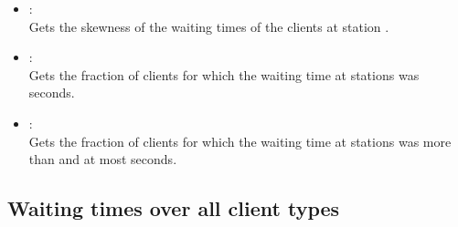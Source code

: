 \begin{itemize}
\item
{}:\\
Gets the skewness of the waiting times of the clients at station . 

\item
{}:\\
Gets the fraction of clients for which the waiting time at stations  was  seconds.

\item
{}:\\
Gets the fraction of clients for which the waiting time at stations  was more than  and at most  seconds.

\end{itemize}



\subsection{Waiting times over all client types}
  
